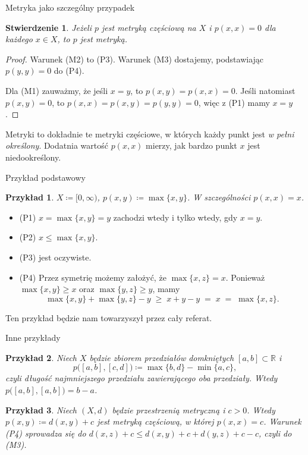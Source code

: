 \documentclass{beamer}
\newtheorem*{stwierdzenie}{Stwierdzenie}
\newtheorem*{przyklad}{Przykład}
\newcommand{\R}{\mathbb{R}}
\begin{document}
\begin{frame}{Metryka jako szczególny przypadek}
  \begin{stwierdzenie}
    Jeżeli $p$ jest metryką częściową na $X$ i $p(x,x)=0$ dla każdego $x\in X$,
    to $p$ jest metryką.
  \end{stwierdzenie}

  \begin{proof}
    Warunek (M2) to (P3). Warunek (M3) dostajemy, podstawiając $p(y,y)=0$ do (P4).

    Dla (M1) zauważmy, że jeśli $x=y$, to $p(x,y)=p(x,x)=0$.
    Jeśli natomiast $p(x,y)=0$, to $p(x,x)=p(x,y)=p(y,y)=0$, więc z (P1) mamy $x=y$.
  \end{proof}

  \medskip
  Metryki to dokładnie te metryki częściowe, w których każdy punkt jest
  \emph{w pełni określony}. Dodatnia wartość $p(x,x)$ mierzy, jak bardzo punkt $x$
  jest niedookreślony.
\end{frame}

\begin{frame}{Przykład podstawowy}
  \begin{przyklad}
    $X\coloneqq[0,\infty)$, $p(x,y)\coloneqq\max\{x,y\}$. W szczególności $p(x,x)=x$.
  \end{przyklad}

  \begin{itemize}
    \item (P1) $x=\max\{x,y\}=y$ zachodzi wtedy i tylko wtedy, gdy $x=y$.
    \item (P2) $x\le\max\{x,y\}$.
    \item (P3) jest oczywiste.
    \item (P4) Przez symetrię możemy założyć, że $\max\{x,z\}=x$. Ponieważ
          $\max\{x,y\}\ge x$ oraz $\max\{y,z\}\ge y$, mamy
          \[
            \max\{x,y\}+\max\{y,z\}-y \;\ge\; x+y-y \;=\; x \;=\; \max\{x,z\}.
          \]
  \end{itemize}

  \medskip
  Ten przykład będzie nam towarzyszył przez cały referat.
\end{frame}

\begin{frame}{Inne przykłady}
  \begin{przyklad}
    Niech $X$ będzie zbiorem przedziałów domkniętych $[a,b]\subset\R$ i
    \[
      p\bigl([a,b],[c,d]\bigr)\coloneqq\max\{b,d\}-\min\{a,c\},
    \]
    czyli długość najmniejszego przedziału zawierającego oba przedziały.
    Wtedy $p\bigl([a,b],[a,b]\bigr)=b-a$.
  \end{przyklad}

  \begin{przyklad}
    Niech $(X,d)$ będzie przestrzenią metryczną i $c>0$. Wtedy
    $p(x,y)\coloneqq d(x,y)+c$ jest metryką częściową, w której $p(x,x)=c$.
    Warunek (P4) sprowadza się do
    $d(x,z)+c\le d(x,y)+c+d(y,z)+c-c$, czyli do (M3).
  \end{przyklad}
\end{frame}
\end{document}
